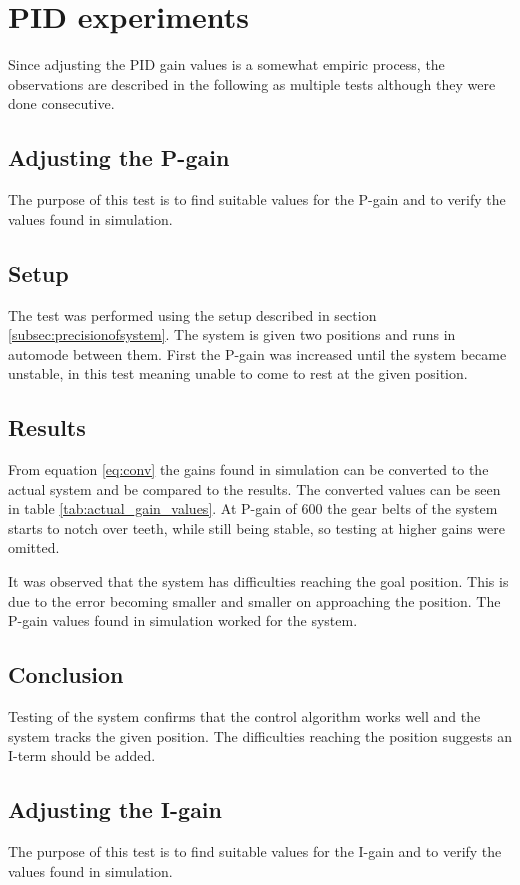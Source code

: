 \chapter{PID experiments}\label{sec:pid_experiments}
Since adjusting the PID gain values is a somewhat empiric process, the
observations are described in the following as multiple tests although they were
done consecutive.

\section{Adjusting the P-gain}\label{sec:pid_experiments_p}
The purpose of this test is to find suitable values for the P-gain and to verify
the values found in simulation.

\section*{Setup} The test was performed using the setup described in
section \ref{subsec:precisionofsystem}. The system is given two positions and runs in
automode between them. First the P-gain was increased until the system became
unstable, in this test meaning unable to come to rest at the given position.

\section*{Results} From equation \ref{eq:conv} the gains found in simulation can be
converted to the actual system and be compared to the results. The converted
values can be seen in table \ref{tab:actual_gain_values}. At P-gain of 600 the gear
belts of the system starts to notch over teeth, while still being stable, so
testing at higher gains were omitted.

It was observed that the system has difficulties reaching
the goal position. This is due to the error becoming smaller and smaller on
approaching the position. The P-gain values found in simulation worked for the
system.

\section*{Conclusion} Testing of the system confirms that the control
algorithm works well and the system tracks the given position. The difficulties
reaching the position suggests an I-term should be added.

\section{Adjusting the I-gain}\label{sec:pid_experiments_i}
The purpose of this test is to find suitable values for the I-gain and to verify
the values found in simulation.

